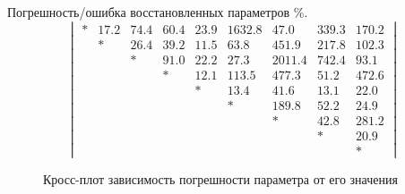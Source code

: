 \documentclass[14pt]{article}
\begin{document}
Погрешность/ошибка восстановленных параметров \%.
\begin{equation*} \label{m3x4}
	\begin{vmatrix}
		* &17.2 &74.4 &60.4 &23.9 &1632.8 &47.0 &339.3 &170.2\\
		&* &26.4 &39.2 &11.5 &63.8 &451.9 &217.8 &102.3\\
		& &* &91.0 &22.2 &27.3 &2011.4 &742.4 &93.1\\
		& & &* &12.1 &113.5 &477.3 &51.2 &472.6\\
		& & & &* &13.4 &41.6 &13.1 &22.0\\
		& & & & &* &189.8 &52.2 &24.9\\
		& & & & & &* &42.8 &281.2\\
		& & & & & & &* &20.9\\
		& & & & & & & &*
	\end{vmatrix}
\end{equation*}

\begin{figure}[h]
	\caption{Кросс-плот зависимость погрешности параметра от его значения}
	\label{fig:err_vs_val}
\end{figure}
\end{document}
